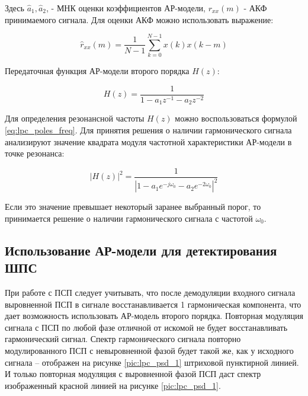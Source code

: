 Здесь ${\hat{a}_1, \hat{a}_2}$, - МНК оценки коэффициентов АР-модели, ${r_{xx}(m)}$ - АКФ принимаемого сигнала.
Для оценки АКФ  можно использовать выражение:

\begin{center}
\begin{equation}
	\label{eq:lpc_rxx_estimation}
	\hat{r}_{xx}(m) = \frac{1}{N-1} \sum \limits_{k=0}^{N-1} x(k)x(k-m)
\end{equation}
\end{center}

Передаточная функция АР-модели второго порядка ${H(z)}$:
\begin{center}
\begin{equation}
	\label{eq:lpc_spectral_func}
	H(z) = \frac{1}{1 - a_1 z^{-1} - a_2 z^{-2}}
\end{equation}
\end{center}

Для определения резонансной частоты ${H(z)}$ можно воспользоваться формулой \ref{eq:lpc_poles_freq}.
Для принятия решения о наличии гармонического сигнала анализируют значение квадрата модуля частотной
характеристики АР-модели в точке резонанса:

\begin{center}
\begin{equation}
	\label{eq:lpc_power_cos}
	\left| H(z) \right|^2 = \frac{1}{\left| 1 - a_1 e^{-j \omega_0} - a_2 e^{-2 \omega_0} \right|^2}
\end{equation}
\end{center}

Если это значение превышает некоторый заранее выбранный порог, то принимается решение о наличии гармонического
сигнала с частотой ${\omega_0}$. 

\subsection{Использование АР-модели для детектирования ШПС}
\label{ssec4:lpc_cdma_detect}

При работе с ПСП следует учитывать, что после демодуляции входного сигнала выровненной ПСП в сигнале восстанавливается 1 гармоническая
компонента, что дает возможность использовать АР-модель второго порядка.
Повторная модуляция сигнала с ПСП по любой фазе отличной от искомой не будет восстанавливать гармонический сигнал.
Спектр гармонического сигнала повторно модулированного ПСП с невыровненной фазой будет такой же, как у исходного сигнала – отображен
на рисунке \ref{pic:lpc_psd_1} штриховой пунктирной линией. И только повторная модуляция с выровненной фазой ПСП даст спектр
изображенный красной линией на рисунке \ref{pic:lpc_psd_1}.

